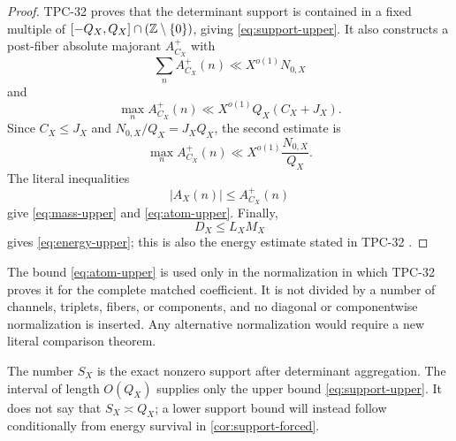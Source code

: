 \begin{proof}
TPC-32 proves that the determinant support is contained in a fixed
multiple of
\([ -Q_X,Q_X]\cap(\mathbb Z\setminus\{0\})\), giving
\eqref{eq:support-upper}.  It also constructs a post-fiber absolute
majorant \(A_{C_X}^+\) with
\[
 \sum_n A_{C_X}^+(n)\ll X^{o(1)}N_{0,X}
\]
and
\[
 \max_n A_{C_X}^+(n)
 \ll X^{o(1)}Q_X(C_X+J_X).
\]
Since \(C_X\le J_X\) and
\(N_{0,X}/Q_X=J_XQ_X\), the second estimate is
\[
 \max_n A_{C_X}^+(n)
 \ll X^{o(1)}\frac{N_{0,X}}{Q_X}.
\]
The literal inequalities
\[
 |A_X(n)|\le A_{C_X}^+(n)
\]
give \eqref{eq:mass-upper} and \eqref{eq:atom-upper}.  Finally,
\[
 D_X\le L_XM_X
\]
gives \eqref{eq:energy-upper}; this is also the energy estimate stated
in TPC-32 \citep{WangTPC32}.
\end{proof}

\begin{remark}
\label{rem:no-renormalization}
The bound \eqref{eq:atom-upper} is used only in the normalization in
which TPC-32 proves it for the complete matched coefficient.  It is
not divided by a number of channels, triplets, fibers, or
components, and no diagonal or componentwise normalization is
inserted.  Any alternative normalization would require a new literal
comparison theorem.
\end{remark}

\begin{remark}
The number \(S_X\) is the exact nonzero support after determinant
aggregation.  The interval of length \(O(Q_X)\) supplies only the
upper bound \eqref{eq:support-upper}.  It does not say that
\(S_X\asymp Q_X\); a lower support bound will instead follow
conditionally from energy survival in \cref{cor:support-forced}.
\end{remark}
